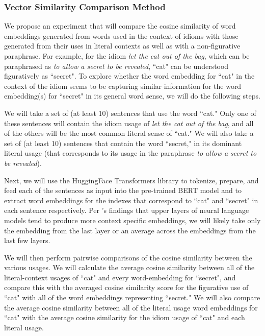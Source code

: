 \documentclass[11pt,a4paper]{article}
\begin{document}
 \subsubsection{Vector Similarity Comparison Method}
 
 We propose an experiment that will compare the cosine similarity of word embeddings generated from words used in the context of idioms with those generated from their uses in literal contexts as well as with a non-figurative paraphrase. For example, for the idiom \textit{let the cat out of the bag}, which can be paraphrased as \textit{to allow a secret to be revealed}, ``cat" can be understood figuratively as ``secret". To explore whether the word embedding for ``cat" in the context of the idiom seems to be capturing similar information for the word embedding(s) for ``secret" in its general word sense, we will do the following steps. 
 
 We will take a set of (at least 10) sentences that use the word ``cat."  Only one of these sentences will contain the idiom usage of \textit{let the cat out of the bag}, and all of the others will be the most common literal sense of ``cat." We will also take a set of (at least 10) sentences that contain the word ``secret," in its dominant literal usage (that corresponds to its usage in the paraphrase \textit{to allow a secret to be revealed}). 
 
 Next, we will use the HuggingFace Transformers library \citep{wolf2019huggingfaces} to tokenize, prepare, and feed each of the sentences as input into the pre-trained BERT model and to extract word embeddings for the indexes that correspond to ``cat" and ``secret" in each sentence respectively. Per \citep{ethayarajh2019contextual}'s findings that upper layers of neural language models tend to produce more context specific embeddings, we will likely take only the embedding from the last layer or an average across the embeddings from the last few layers.
 
 We will then perform pairwise comparisons of the cosine similarity between the various usages. We will calculate the average cosine similarity between all of the literal-context usages of ``cat" and every word-embedding for ``secret", and compare this with the averaged cosine similarity score for the figurative use of ``cat" with all of the  word embeddings representing ``secret." We will also compare the average cosine similarity between all of the literal usage word embeddings for ``cat" with the average cosine similarity for the idiom usage of ``cat" and each literal usage.
 
\end{document}
